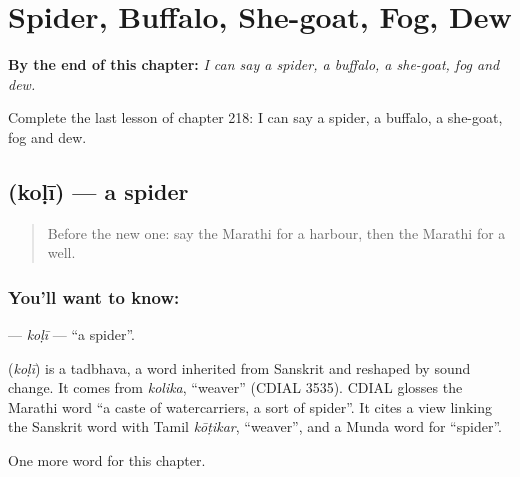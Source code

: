 
\chapter{Spider, Buffalo, She-goat, Fog, Dew}
\label{ch:mr-spider-buffalo-she-goat-fog-dew}

\begin{chapteropening}
\textbf{By the end of this chapter:} \emph{I can say a spider, a buffalo, a she-goat, fog and dew.}

Complete the last lesson of chapter 218: I can say a spider, a buffalo, a she-goat, fog and dew.
\end{chapteropening}

\section[\texorpdfstring{\mr{कोळी} (koḷī)}{कोळी (koḷī)}]{ (koḷī) — a spider}

\label{lesson:MR-C218-koli}



\begin{quote}
Before the new one: say the Marathi for a harbour, then the Marathi for a well.
\end{quote}

\subsection*{You'll want to know: }
\textbf{} — \emph{koḷī} — \textquotedblleft{}a spider\textquotedblright{}.

\begin{cousinweb}
\textbf{} (\emph{koḷī}) is a tadbhava, a word inherited from Sanskrit and reshaped by sound change. It comes from \emph{kolika}, \textquotedblleft{}weaver\textquotedblright{} (CDIAL 3535). CDIAL glosses the Marathi word \textquotedblleft{}a caste of watercarriers, a sort of spider\textquotedblright{}. It cites a view linking the Sanskrit word with Tamil \emph{kōṭikar}, \textquotedblleft{}weaver\textquotedblright{}, and a Munda word for \textquotedblleft{}spider\textquotedblright{}.
\end{cousinweb}

\begin{grammarlens}[title={What you've built}]
One more word for this chapter.
\end{grammarlens}

